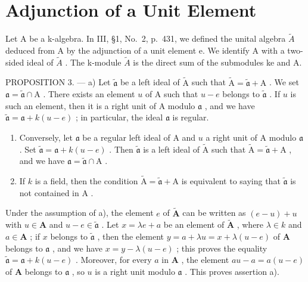 \section{Adjunction of a Unit Element}

Let A be a k-algebra. In III, §1, No.~2, p.~431, we defined the unital algebra \(\widetilde{A}\) deduced from A by the adjunction of a unit element e. We identify A with a two-sided ideal of \(\widetilde{A}\) . The k-module \(\widetilde{A}\) is the direct sum of the submodules ke and A.

PROPOSITION 3. --- a) Let \(\widetilde{\mathfrak{a}}\) be a left ideal of \(\widetilde{\mathrm{A}}\) such that \(\widetilde{\mathrm{A}} = \widetilde{\mathfrak{a}} + \mathrm{A}\) . We set \(\mathfrak{a} = \widetilde{\mathfrak{a}} \cap \mathrm{A}\) . There exists an element \(u\) of \(\mathrm{A}\) such that \(u - e\) belongs to \(\widetilde{\mathfrak{a}}\) . If \(u\) is such an element, then it is a right unit of \(\mathrm{A}\) modulo \(\mathfrak{a}\) , and we have \(\widetilde{\mathfrak{a}} = \mathfrak{a} + k(u - e)\) ; in particular, the ideal \(\mathfrak{a}\) is regular.

\begin{enumerate}
\def\labelenumi{\alph{enumi})}
\setcounter{enumi}{1}
\item
  Conversely, let \(\mathfrak{a}\) be a regular left ideal of A and \(u\) a right unit of A modulo \(\mathfrak{a}\) . Set \(\widetilde{\mathfrak{a}} = \mathfrak{a} + k(u - e)\) . Then \(\widetilde{\mathfrak{a}}\) is a left ideal of \(\widetilde{\mathrm{A}}\) such that \(\widetilde{\mathrm{A}} = \widetilde{\mathfrak{a}} + \mathrm{A}\) , and we have \(\mathfrak{a} = \widetilde{\mathfrak{a}} \cap \mathrm{A}\) .
\item
  If \(k\) is a field, then the condition \(\widetilde{\mathrm{A}} = \widetilde{\mathfrak{a}} + \mathrm{A}\) is equivalent to saying that \(\widetilde{\mathfrak{a}}\) is not contained in \(\mathrm{A}\) .
\end{enumerate}

Under the assumption of a), the element \(e\) of \(\widetilde{\mathbf{A}}\) can be written as \((e - u) + u\) with \(u \in \mathbf{A}\) and \(u - e \in \widetilde{\mathfrak{a}}\) . Let \(x = \lambda e + a\) be an element of \(\widetilde{\mathbf{A}}\) , where \(\lambda \in k\) and \(a \in \mathbf{A}\) ; if \(x\) belongs to \(\widetilde{\mathfrak{a}}\) , then the element \(y = a + \lambda u = x + \lambda (u - e)\) of \(\mathbf{A}\) belongs to \(\mathfrak{a}\) , and we have \(x = y - \lambda (u - e)\) ; this proves the equality \(\widetilde{\mathfrak{a}} = \mathfrak{a} + k(u - e)\) . Moreover, for every \(a\) in \(\mathbf{A}\) , the element \(au - a = a(u - e)\) of \(\mathbf{A}\) belongs to \(\mathfrak{a}\) , so \(u\) is a right unit modulo \(\mathfrak{a}\) . This proves assertion a).

